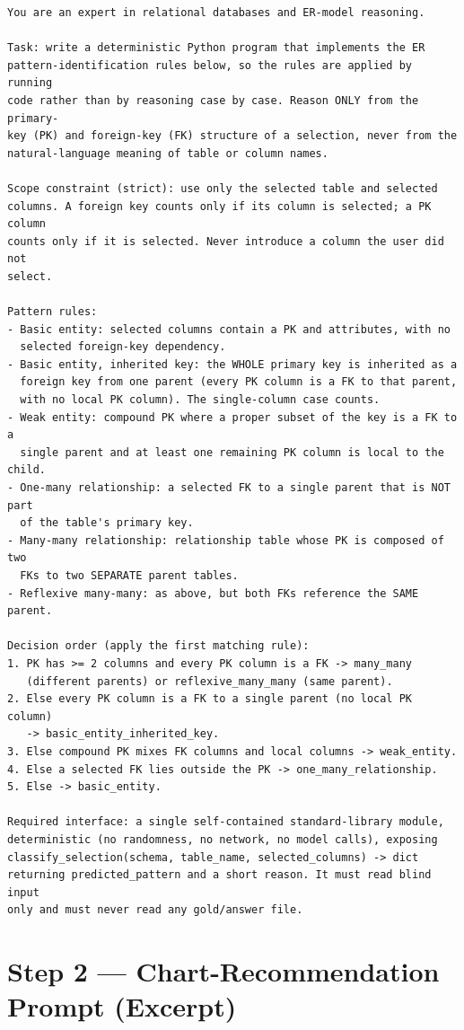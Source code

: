 \begin{verbatim}
You are an expert in relational databases and ER-model reasoning.

Task: write a deterministic Python program that implements the ER
pattern-identification rules below, so the rules are applied by running
code rather than by reasoning case by case. Reason ONLY from the primary-
key (PK) and foreign-key (FK) structure of a selection, never from the
natural-language meaning of table or column names.

Scope constraint (strict): use only the selected table and selected
columns. A foreign key counts only if its column is selected; a PK column
counts only if it is selected. Never introduce a column the user did not
select.

Pattern rules:
- Basic entity: selected columns contain a PK and attributes, with no
  selected foreign-key dependency.
- Basic entity, inherited key: the WHOLE primary key is inherited as a
  foreign key from one parent (every PK column is a FK to that parent,
  with no local PK column). The single-column case counts.
- Weak entity: compound PK where a proper subset of the key is a FK to a
  single parent and at least one remaining PK column is local to the child.
- One-many relationship: a selected FK to a single parent that is NOT part
  of the table's primary key.
- Many-many relationship: relationship table whose PK is composed of two
  FKs to two SEPARATE parent tables.
- Reflexive many-many: as above, but both FKs reference the SAME parent.

Decision order (apply the first matching rule):
1. PK has >= 2 columns and every PK column is a FK -> many_many
   (different parents) or reflexive_many_many (same parent).
2. Else every PK column is a FK to a single parent (no local PK column)
   -> basic_entity_inherited_key.
3. Else compound PK mixes FK columns and local columns -> weak_entity.
4. Else a selected FK lies outside the PK -> one_many_relationship.
5. Else -> basic_entity.

Required interface: a single self-contained standard-library module,
deterministic (no randomness, no network, no model calls), exposing
classify_selection(schema, table_name, selected_columns) -> dict
returning predicted_pattern and a short reason. It must read blind input
only and must never read any gold/answer file.
\end{verbatim}

\section{Step 2 --- Chart-Recommendation Prompt (Excerpt)}
\label{app:step2-prompt}

